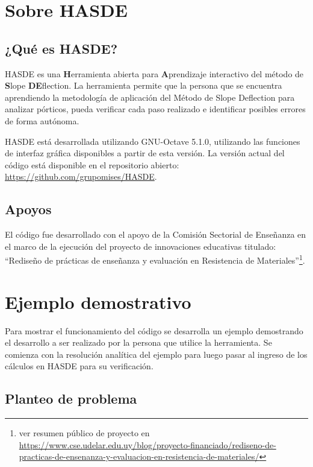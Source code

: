 
\section{Sobre HASDE}

\subsection{¿Qué es HASDE?}

HASDE es una \textbf{H}erramienta abierta para \textbf{A}prendizaje interactivo del método de \textbf{S}lope \textbf{DE}flection. %
%
La herramienta permite que la persona que se encuentra aprendiendo la metodología de aplicación del Método de Slope Deflection para analizar pórticos, pueda verificar cada paso realizado e identificar posibles errores de forma autónoma.


HASDE está desarrollada utilizando GNU-Octave 5.1.0, utilizando las funciones de interfaz gráfica disponibles a partir de esta versión. %
%
La versión actual del código está disponible en el repositorio abierto: \href{https://github.com/grupomises/HASDE}{https://github.com/grupomises/HASDE}. 

\subsection{Apoyos}
El código fue desarrollado con el apoyo de la Comisión Sectorial de Enseñanza en el marco de la ejecución del proyecto de innovaciones educativas titulado: 
``Rediseño de prácticas de enseñanza y evaluación en Resistencia de Materiales''\footnote{ver resumen público de proyecto en	\href{https://www.cse.udelar.edu.uy/blog/proyecto-financiado/rediseno-de-practicas-de-ensenanza-y-evaluacion-en-resistencia-de-materiales/}{https://www.cse.udelar.edu.uy/blog/proyecto-financiado/rediseno-de-practicas-de-ensenanza-y-evaluacion-en-resistencia-de-materiales/}}.


\section{Ejemplo demostrativo}

Para mostrar el funcionamiento del código se desarrolla un ejemplo demostrando el desarrollo a ser realizado por la persona que utilice la herramienta. Se comienza con la resolución analítica del ejemplo para luego pasar al ingreso de los cálculos en HASDE para su verificación.

\subsection{Planteo de problema}

